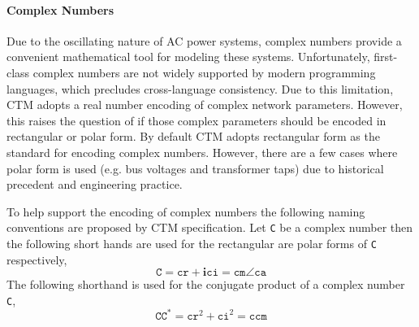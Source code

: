 \documentclass{article}
\begin{document}
\paragraph{Complex Numbers}
%
Due to the oscillating nature of AC power systems, complex numbers provide a convenient mathematical tool for modeling these systems.  Unfortunately, first-class complex numbers are not widely supported by modern programming languages, which precludes cross-language consistency.  Due to this limitation, CTM adopts a real number encoding of complex network parameters.  However, this raises the question of if those complex parameters should be encoded in rectangular or polar form.  By default CTM adopts rectangular form as the standard for encoding complex numbers.  However, there are a few cases where polar form is used (e.g. bus voltages and transformer taps) due to historical precedent and engineering practice.

To help support the encoding of complex numbers the following naming conventions are proposed by CTM specification.  Let \texttt{C} be a complex number then the following short hands are used for the rectangular are polar forms of \texttt{C} respectively,
$$
\texttt{C} = \texttt{cr}+ \bm i\texttt{ci} = \texttt{cm} \angle \texttt{ca}
$$
The following shorthand is used for the conjugate product of a complex number \texttt{C},
$$
\texttt{CC}^* = \texttt{cr}^2 + \texttt{ci}^2 = \texttt{ccm}
$$
\end{document}
